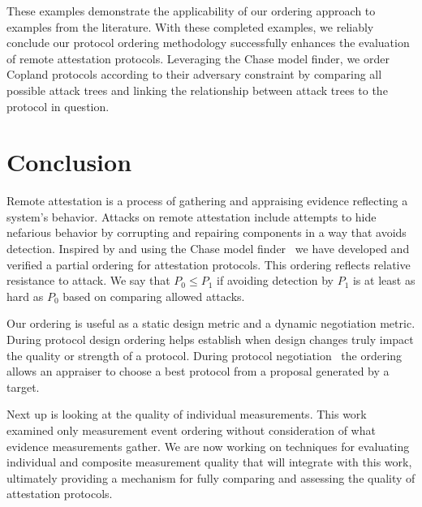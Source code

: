 \documentclass[runningheads]{llncs}
\theoremstyle{definition}
\begin{document}
These examples demonstrate the applicability of our ordering approach
to examples from the literature. With these completed examples, we
reliably conclude our protocol ordering methodology successfully
enhances the evaluation of remote attestation protocols. Leveraging
the Chase model finder, we order Copland protocols according to their
adversary constraint by comparing all possible attack trees and
linking the relationship between attack trees to the protocol in
question. 

\section{Conclusion}

Remote attestation is a process of gathering and appraising evidence
reflecting a system's behavior.  Attacks on remote attestation include
attempts to hide nefarious behavior by corrupting and repairing
components in a way that avoids detection.  Inspired by
\citet{Rowe:2021:OnOrdering} and using the Chase model
finder~\citep{Ramsdell:2020:Chase} we have developed and verified a
partial ordering for attestation protocols.  This ordering reflects
relative resistance to attack.  We say that $P_0\leq P_1$ if avoiding
detection by $P_1$ is at least as hard as $P_0$ based on comparing
allowed attacks.

Our ordering is useful as a static design metric and a dynamic
negotiation metric.  During protocol design ordering helps establish
when design changes truly impact the quality or strength of a
protocol.  During protocol negotiation~\citep{Fritz:2023:framework}
the ordering allows an appraiser to choose a best protocol from a
proposal generated by a target.

Next up is looking at the quality of individual measurements.  This
work examined only measurement event ordering without consideration of
what evidence measurements gather.  We are now working on techniques for
evaluating individual and composite measurement quality that will
integrate with this work, ultimately providing a mechanism for fully
comparing and assessing the quality of attestation protocols.






%
% 
%
%
%

%

%
\end{document}

